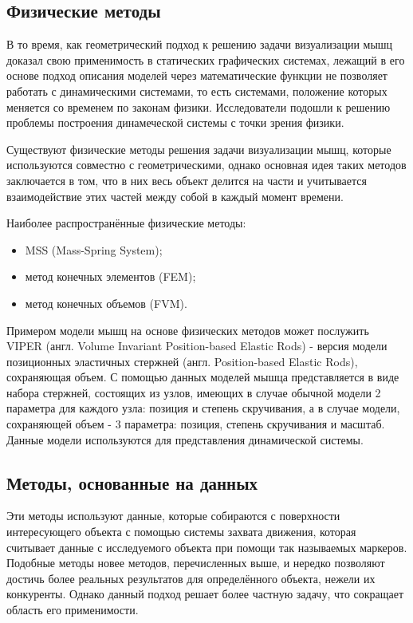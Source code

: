 \subsection{Физические методы}

В то время, как геометрический подход к решению задачи визуализации мышц доказал свою применимость в статических графических системах, лежащий в его основе подход описания моделей через математические функции не позволяет работать с динамическими системами, то есть системами, положение которых меняется со временем по законам физики\cite{cgv}. Исследователи подошли к решению проблемы построения динамеческой системы с точки зрения физики.

Существуют физические методы решения задачи визуализации мышц, которые используются совместно с геометрическими, однако основная идея таких методов заключается в том, что в них весь объект делится на части и учитывается взаимодействие этих частей между собой в каждый момент времени.

Наиболее распространённые физические методы:
\begin{itemize}
    \item MSS (Mass-Spring System)\cite{mss};
    \item метод конечных элементов (FEM)\cite{fem1}\cite{fem2};
    \item метод конечных объемов (FVM)\cite{fvm1}\cite{fvm2}.
\end{itemize}

\label{phys}
Примером модели мышц на основе физических методов может послужить VIPER\cite{viper} (англ. Volume Invariant Position-based Elastic Rods) - версия модели позиционных эластичных стержней\cite{per} (англ. Position-based Elastic Rods), сохраняющая объем. С помощью данных моделей мышца представляется в виде набора стержней, состоящих из узлов, имеющих в случае обычной модели 2 параметра для каждого узла: позиция и степень скручивания, а в случае модели, сохраняющей объем - 3 параметра: позиция, степень скручивания и масштаб. Данные модели используются для представления динамической системы. 

\subsection{Методы, основанные на данных}

Эти методы используют данные, которые собираются с поверхности интересующего объекта с помощью системы захвата движения, которая считывает данные с исследуемого объекта при помощи так называемых маркеров\cite{dda}. Подобные методы новее методов, перечисленных выше, и нередко позволяют достичь более реальных результатов для определённого объекта, нежели их конкуренты. Однако данный подход решает более частную задачу, что сокращает область его применимости.


